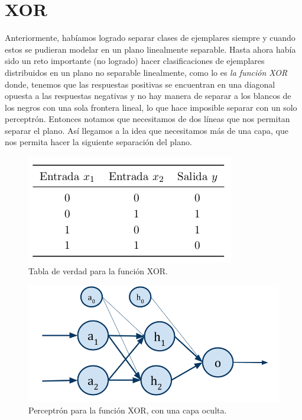 \section{XOR}


Anteriormente, habíamos logrado separar clases de ejemplares siempre y cuando estos se pudieran modelar en un plano linealmente separable. Hasta ahora había sido un reto importante (no logrado) hacer clasificaciones de ejemplares distribuidos en un plano no separable linealmente, como lo es \emph{la función XOR} donde, tenemos que las respuestas positivas se encuentran en una diagonal opuesta a las respuestas negativas y no hay manera de separar a los blancos de los negros con una sola frontera lineal, lo que hace imposible separar con un solo perceptrón. Entonces notamos que necesitamos de dos líneas que nos permitan separar el plano. Así llegamos a la idea que necesitamos más de una capa, que nos permita hacer la siguiente separación del plano.

\begin{figure}[H]
 \centering
 \includegraphics[scale=0.5]{../Figuras/TablaXor.png}
 \caption{Tabla de verdad para la función XOR.}
 \label{fig:tablaXOR}
\end{figure}

\begin{figure}[H]
 \centering
 \includegraphics[scale=0.3]{../Figuras/XOr.png}
 \caption{Perceptrón para la función XOR, con una capa oculta.}
 \label{fig:pXor}
\end{figure}



